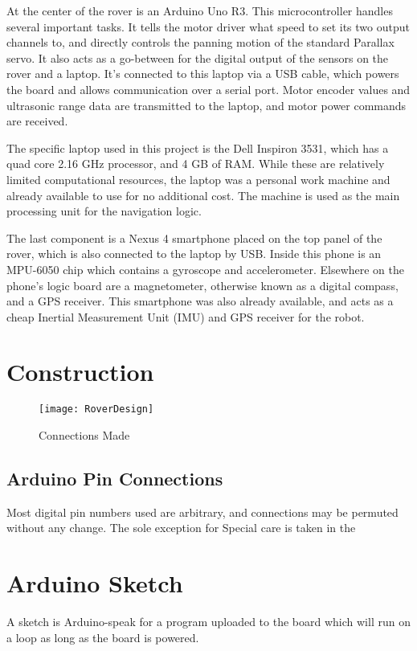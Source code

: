 At the center of the rover is an Arduino Uno R3. This microcontroller handles several important tasks. It tells the motor driver what speed to set its two output channels to, and directly controls the panning motion of the standard Parallax servo. It also acts as a go-between for the digital output of the sensors on the rover and a laptop. It's connected to this laptop via a USB cable, which powers the board and allows communication over a serial port. Motor encoder values and ultrasonic range data are transmitted to the laptop, and motor power commands are received.

The specific laptop used in this project is the Dell Inspiron 3531, which has a quad core 2.16 GHz processor, and 4 GB of RAM. While these are relatively limited computational resources, the laptop was a personal work machine and already available to use for no additional cost. The machine is used as the main processing unit for the navigation logic. 

The last component is a Nexus 4 smartphone placed on the top panel of the rover, which is also connected to the laptop by USB. Inside this phone is an MPU-6050 chip which contains a gyroscope and accelerometer. Elsewhere on the phone's logic board are a magnetometer, otherwise known as a digital compass, and a GPS receiver. This smartphone was also already available, and acts as a cheap Inertial Measurement Unit (IMU) and GPS receiver for the robot.

\section{Construction}

\begin{figure}[h]
	\caption{Connections Made}
	\texttt{[image: RoverDesign]}
	\centering
\end{figure}

\subsection{Arduino Pin Connections}
Most digital pin numbers used are arbitrary, and connections may be permuted without any change. The sole exception  for Special care is taken in the 

\section{Arduino Sketch}
A sketch is Arduino-speak for a program uploaded to the board which will run on a loop as long as the board is powered.
